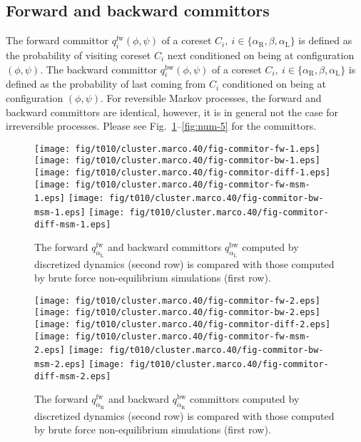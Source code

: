 \documentclass[aps, pre, preprint,unsortedaddress,a4paper,onecolumn]{revtex4}
\newcommand{\fwd}[0]{\textrm{fw}}
\newcommand{\bwd}[0]{\textrm{bw}}
\newcommand{\confaa}[0]{{\alpha_{\textrm{R}}}}
\newcommand{\confc}[0]{{\alpha_{\textrm{L}}}}
\begin{document}
\subsection{Forward and backward committors}

The forward committor $q^\fwd_i(\phi,\psi)$ of a coreset $C_i,\
i\in\{\confaa, \beta, \confc\}$ is defined as the probability of
visiting coreset $C_i$ next conditioned on being at configuration
$(\phi,\psi)$.  The backward committor $q^\bwd_i(\phi,\psi)$ of a
coreset $C_i,\ i\in\{\confaa, \beta, \confc\}$ is defined as the
probability of last coming from $C_i$ conditioned on being at
configuration $(\phi,\psi)$.  For reversible Markov processes, the
forward and backward committors are identical, however, it is in
general not the case for irreversible processes. Please see
Fig.~\ref{fig:num-3}--\ref{fig:num-5} for the committors.

\begin{figure}
  \centering
  \texttt{[image: fig/t010/cluster.marco.40/fig-commitor-fw-1.eps]}
  \texttt{[image: fig/t010/cluster.marco.40/fig-commitor-bw-1.eps]}
  \texttt{[image: fig/t010/cluster.marco.40/fig-commitor-diff-1.eps]}\\
  \texttt{[image: fig/t010/cluster.marco.40/fig-commitor-fw-msm-1.eps]}
  \texttt{[image: fig/t010/cluster.marco.40/fig-commitor-bw-msm-1.eps]}
  \texttt{[image: fig/t010/cluster.marco.40/fig-commitor-diff-msm-1.eps]}
  \caption{The forward $q^\fwd_{\confc}$ and backward committors
    $q^\bwd_{\confc}$ computed by discretized dynamics (second row) is compared with
    those computed by brute force non-equilibrium simulations (first
    row).}
  \label{fig:num-3}
\end{figure}

\begin{figure}
  \centering
  \texttt{[image: fig/t010/cluster.marco.40/fig-commitor-fw-2.eps]}
  \texttt{[image: fig/t010/cluster.marco.40/fig-commitor-bw-2.eps]}
  \texttt{[image: fig/t010/cluster.marco.40/fig-commitor-diff-2.eps]}\\
  \texttt{[image: fig/t010/cluster.marco.40/fig-commitor-fw-msm-2.eps]}
  \texttt{[image: fig/t010/cluster.marco.40/fig-commitor-bw-msm-2.eps]}
  \texttt{[image: fig/t010/cluster.marco.40/fig-commitor-diff-msm-2.eps]}
  \caption{The forward $q^\fwd_{\confaa}$ and backward
    $q^\bwd_{\confaa}$ committors computed by discretized dynamics (second row) is
    compared with those computed by brute force non-equilibrium
    simulations (first row).}
  \label{fig:num-4}
\end{figure}
\end{document}
